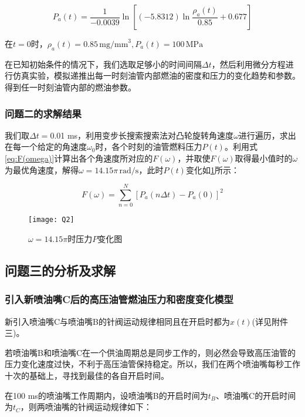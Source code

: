 \documentclass[withoutpreface,bwprint]{cumcmthesis} %
\begin{document}
\begin{equation}
P_{a}(t)=\frac{1}{-0.0039} \ln\left[\left(-5.8312 \right)\ln \frac{\rho_a(t)}{0.85}+0.677\right]	
\end{equation}

在$t=0$时，$\rho_a (t)=0.85\,\text{mg/mm}^{3},P_a(t)=100\,\text{MPa}$


在已知初始条件的情况下，我们选取足够小的时间间隔$\Delta t$，然后利用微分方程进行仿真实验，模拟递推出每一时刻油管内部燃油的密度和压力的变化趋势和参数。得到任一时刻油管内部的燃油参数。
\subsubsection{问题二的求解结果}

我们取$\Delta t=$0.01 ms，利用变步长搜索搜索法对凸轮旋转角速度$\omega$进行遍历，求出在每一个给定的角速度$\omega_{0}$时，各个时刻的油管燃料压力$P(t)$。利用式\cref{eq:F(omega)}计算出各个角速度所对应的$F(\omega)$，并取使$F(\omega)$取得最小值时的$\omega$为最优角速度，解得$\omega=14.15\pi \, \text{rad/s}$，此时$P(t)$变化如\cref{fig:Q2}所示：


\begin{equation} \label{eq:F(omega)}
 F(\omega)=\sum_{n=0}^N[P_{a}(n\Delta t)-P_{a}(0)]^2
\end{equation}

\begin{figure}[!h]
	\centering
	\texttt{[image: Q2]}
	\caption{$\omega=14.15\pi$时压力$P$变化图}
	\label{fig:Q2}
\end{figure}

\subsection{问题三的分析及求解}

\subsubsection{引入新喷油嘴C后的高压油管燃油压力和密度变化模型}

新引入喷油嘴C与喷油嘴B的针阀运动规律相同且在开启时都为$x(t)$(详见附件三)。

若喷油嘴B和喷油嘴C在一个供油周期总是同步工作的，则必然会导致高压油管的压力变化速度过快，不利于高压油管保持稳定。所以，我们在两个喷油嘴每秒工作十次的基础上，寻找到最佳的各自开启时间。

在100 ms的喷油嘴工作周期内，设喷油嘴B的开启时间为$t_{B}$、喷油嘴C的开启时间为$t_{C}$，则两喷油嘴的针阀运动规律如下：
\end{document}
